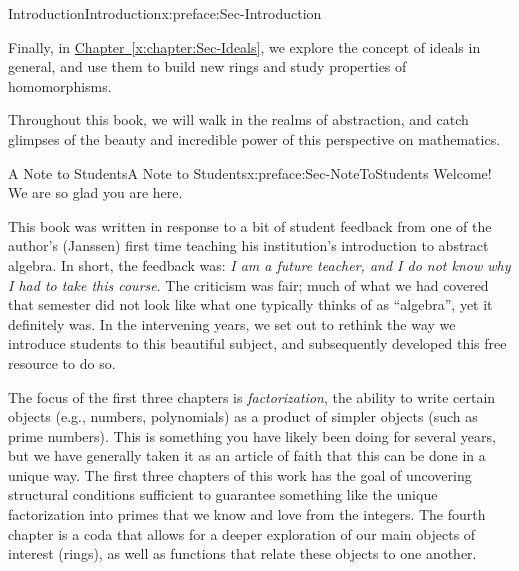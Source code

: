 \documentclass[oneside,10pt,]{book}
\newcommand{\xreffont}{\relax}
\numberwithin{equation}{section}
\begin{document}
\begin{preface}{Introduction}{}{Introduction}{}{}{x:preface:Sec-Introduction}
\par
Finally, in \hyperref[x:chapter:Sec-Ideals]{Chapter~{\xreffont\ref{x:chapter:Sec-Ideals}}}, we explore the concept of ideals in general, and use them to build new rings and study properties of homomorphisms.%
\par
Throughout this book, we will walk in the realms of abstraction, and catch glimpses of the beauty and incredible power of this perspective on mathematics.%
%
%
%
%
\typeout{************************************************}
\typeout{************************************************}
%
\begin{preface}{A Note to Students}{}{A Note to Students}{}{}{x:preface:Sec-NoteToStudents}
Welcome! We are so glad you are here.%
\par
This book was written in response to a bit of student feedback from one of the author's (Janssen) first time teaching his institution's introduction to abstract algebra. In short, the feedback was: \emph{I am a future teacher, and I do not know why I had to take this course}. The criticism was fair; much of what we had covered that semester did not look like what one typically thinks of as ``algebra'', yet it definitely was. In the intervening years, we set out to rethink the way we introduce students to this beautiful subject, and subsequently developed this free resource to do so.%
\par
The focus of the first three chapters is \emph{factorization}, the ability to write certain objects (e.g., numbers, polynomials) as a product of simpler objects (such as prime numbers). This is something you have likely been doing for several years, but we have generally taken it as an article of faith that this can be done in a unique way. The first three chapters of this work has the goal of uncovering structural conditions sufficient to guarantee something like the unique factorization into primes that we know and love from the integers. The fourth chapter is a coda that allows for a deeper exploration of our main objects of interest (rings), as well as functions that relate these objects to one another.%

\end{preface}
\end{preface}
\end{document}
